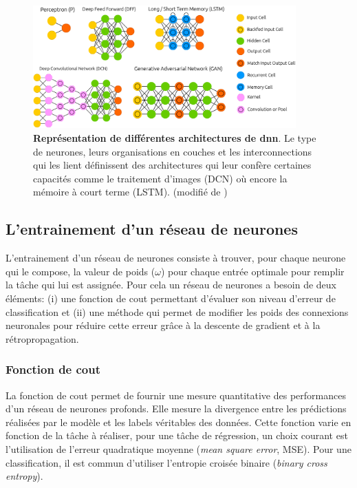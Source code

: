 \begin{figure}[!htbp]
 \centering
 \includegraphics[width=0.9\textwidth]{figures/dnn_archi.png}
 \caption[Représentation de différentes architectures de \gls{dnn}]{\textbf{Représentation de différentes architectures de \gls{dnn}}. Le type de neurones, leurs organisations en couches et les interconnections qui les lient définissent des architectures qui leur confère certaines capacités comme le traitement d'images (DCN) où encore la mémoire à court terme (LSTM). (modifié de \cite{leijnen_neural_2016})}
 \label{fig:dnn_archi}
\end{figure}


\subsection{L'entrainement d'un réseau de neurones}
L'entrainement d'un réseau de neurones consiste à trouver, pour chaque neurone qui le compose, la valeur de poids ($\omega$) pour chaque entrée optimale pour remplir la tâche qui lui est assignée. Pour cela un réseau de neurones a besoin de deux éléments: (i) une fonction de cout permettant d'évaluer son niveau d'erreur de classification et (ii) une méthode qui permet de modifier les poids des connexions neuronales pour réduire cette erreur grâce à la descente de gradient et à la rétropropagation.

\subsubsection{Fonction de cout}
La fonction de cout permet de fournir une mesure quantitative des performances d'un réseau de neurones profonds. Elle mesure la divergence entre les prédictions réalisées par le modèle et les labels véritables des données. Cette fonction varie en fonction de la tâche à réaliser, pour une tâche de régression, un choix courant est l'utilisation de l'erreur quadratique moyenne (\textit{mean square error}, MSE). Pour une classification, il est commun d'utiliser l'entropie croisée binaire (\textit{binary cross entropy}). 


